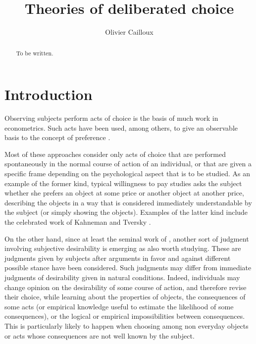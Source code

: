 \documentclass[version=last, pagesize, twoside=off, bibliography=totoc, DIV=calc, fontsize=12pt, a4paper, french, english]{scrartcl}
\begin{document}
\title{Theories of deliberated choice}
\author{Olivier Cailloux}
\makeatletter
{}
\makeatother
\maketitle

\begin{abstract}
  To be written.
\end{abstract}

\section{Introduction}
Observing subjects perform acts of choice is the basis of much work in econometrics. Such acts have been used, among others, to give an observable basis to the concept of preference \citep{samuelson_foundations_1983}. %

Most of these approaches consider only acts of choice that are performed spontaneously in the normal course of action of an individual, or that are given a specific frame depending on the psychological aspect that is to be studied. As an example of the former kind, typical willingness to pay studies asks the subject whether she prefers an object at some price or another object at another price, describing the objects in a way that is considered immediately understandable by the subject (or simply showing the objects). Examples of the latter kind include the celebrated work of Kahneman and Tversky \citep{bell_descriptive_1988, kahneman_thinking_2012}.

On the other hand, since at least the seminal work of \citet{fishkin_when_2011}, another sort of judgment involving subjective desirability is emerging as also worth studying. These are judgments given by subjects after arguments in favor and against different possible stance have been considered. Such judgments may differ from immediate judgments of desirability given in natural conditions. Indeed, individuals may change opinion on the desirability of some course of action, and therefore revise their choice, while learning about the properties of objects, the consequences of some acts (or empirical knowledge useful to estimate the likelihood of some consequences), or the logical or empirical impossibilities between consequences. This is particularly likely to happen when choosing among non everyday objects or acts whose consequences are not well known by the subject.
\end{document}
